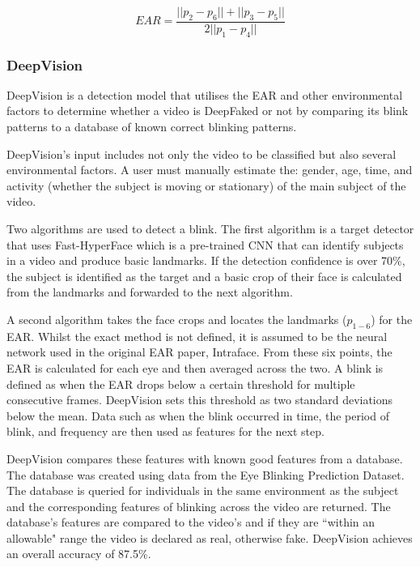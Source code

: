 \begin{equation}
    \label{eq:ear}
    EAR=\frac{||p_2-p_6|| + ||p_3-p_5||}{2||p_1-p_4||}
\end{equation}

\subsubsection{DeepVision}

DeepVision\cite{jung2020deepvision} is a detection model that utilises the EAR and other environmental factors to determine whether a video is DeepFaked or not by comparing its blink patterns to a database of known correct blinking patterns.

DeepVision's input includes not only the video to be classified but also several environmental factors. A user must manually estimate the: gender, age, time, and activity (whether the subject is moving or stationary) of the main subject of the video. 

Two algorithms are used to detect a blink. The first algorithm is a target detector that uses Fast-HyperFace\cite{ranjan2017hyperface} which is a pre-trained CNN that can identify subjects in a video and produce basic landmarks. If the detection confidence is over 70\%, the subject is identified as the target and a basic crop of their face is calculated from the landmarks and forwarded to the next algorithm.

A second algorithm takes the face crops and locates the landmarks ($p_{1-6}$) for the EAR. Whilst the exact method is not defined, it is assumed to be the neural network used in the original EAR paper, Intraface\cite{xiong2013supervised}. From these six points, the EAR is calculated for each eye and then averaged across the two. A blink is defined as when the EAR drops below a certain threshold for multiple consecutive frames. DeepVision sets this threshold as two standard deviations below the mean. Data such as when the blink occurred in time, the period of blink, and frequency are then used as features for the next step.

DeepVision compares these features with known good features from a database. The database was created using data from the Eye Blinking Prediction Dataset\cite{turing2018eye}. The database is queried for individuals in the same environment as the subject and the corresponding features of blinking across the video are returned. The database's features are compared to the video's and if they are ``within an allowable" range the video is declared as real, otherwise fake. DeepVision achieves an overall accuracy of 87.5\%.

